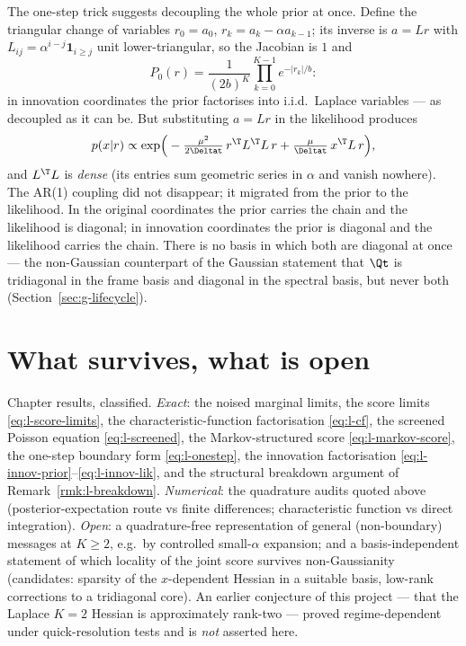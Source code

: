 The one-step trick suggests decoupling the whole prior at once. Define the
triangular change of variables $r_0 = a_0$, $r_k = a_k - \alpha a_{k-1}$;
its inverse is $a = L r$ with $L_{ij} = \alpha^{i-j} \mathbf{1}_{i \geq j}$
unit lower-triangular, so the Jacobian is $1$ and
\begin{equation}
  P_0(r) = \frac{1}{(2b)^K} \prod_{k=0}^{K-1} e^{-|r_k|/b} :
  \label{eq:l-innov-prior}
\end{equation}
in innovation coordinates the prior factorises into i.i.d.\ Laplace
variables --- as decoupled as it can be. But substituting $a = Lr$ in the
likelihood produces
\begin{equation}
  p(x | r) \propto \exp\!\Big(
    -\tfrac{\mu^2}{2\Deltat}\, r^\T L^\T L\, r
    + \tfrac{\mu}{\Deltat}\, x^\T L\, r \Big),
  \label{eq:l-innov-lik}
\end{equation}
and $L^\T L$ is \emph{dense} (its entries sum geometric series in $\alpha$
and vanish nowhere). The AR(1) coupling did not disappear; it migrated from
the prior to the likelihood. In the original coordinates the prior carries
the chain and the likelihood is diagonal; in innovation coordinates the
prior is diagonal and the likelihood carries the chain. There is no basis
in which both are diagonal at once --- the non-Gaussian counterpart of the
Gaussian statement that $\Qt$ is tridiagonal in the frame basis and
diagonal in the spectral basis, but never both
(Section~\ref{sec:g-lifecycle}).

\section{What survives, what is open}

Chapter results, classified. \emph{Exact}: the noised marginal limits, the
score limits \eqref{eq:l-score-limits}, the characteristic-function
factorisation \eqref{eq:l-cf}, the screened Poisson equation
\eqref{eq:l-screened}, the Markov-structured score
\eqref{eq:l-markov-score}, the one-step boundary form
\eqref{eq:l-onestep}, the innovation factorisation
\eqref{eq:l-innov-prior}--\eqref{eq:l-innov-lik}, and the structural
breakdown argument of Remark~\ref{rmk:l-breakdown}. \emph{Numerical}: the
quadrature audits quoted above (posterior-expectation route vs finite
differences; characteristic function vs direct integration). \emph{Open}: a
quadrature-free representation of general (non-boundary) messages at
$K \geq 2$, e.g.\ by controlled small-$\alpha$ expansion; and a
basis-independent statement of which locality of the joint score survives
non-Gaussianity (candidates: sparsity of the $x$-dependent Hessian in a
suitable basis, low-rank corrections to a tridiagonal core). An earlier
conjecture of this project --- that the Laplace $K = 2$ Hessian is
approximately rank-two --- proved regime-dependent under quick-resolution
tests and is \emph{not} asserted here.


